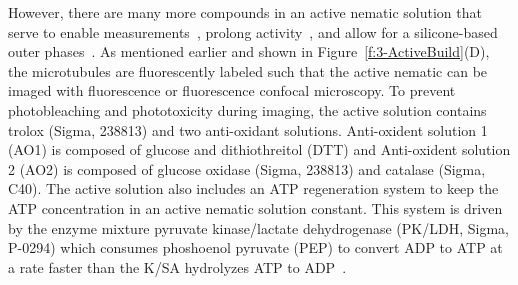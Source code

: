 However, there are many more compounds in an active nematic solution that serve to enable measurements~\cite{RN3,RN135}, prolong activity~\cite{RN3,RN135}, and allow for a silicone-based outer phases~\cite{RN135}.
As mentioned earlier and shown in Figure~\ref{f:3-ActiveBuild}(D), the microtubules are fluorescently labeled such that the active nematic can be imaged with fluorescence or fluorescence confocal microscopy.
To prevent photobleaching and phototoxicity during imaging, the active solution contains trolox (Sigma, 238813) and two anti-oxidant solutions.
Anti-oxident solution 1 (AO1) is composed of glucose and dithiothreitol (DTT) and Anti-oxident solution 2 (AO2) is composed of glucose oxidase (Sigma, 238813) and catalase (Sigma, C40).
The active solution also includes an ATP regeneration system to keep the ATP concentration in an active nematic solution constant.
This system is driven by the enzyme mixture pyruvate kinase/lactate dehydrogenase (PK/LDH, Sigma, P-0294) which consumes phoshoenol pyruvate (PEP) to convert ADP to ATP at a rate faster than the K/SA hydrolyzes ATP to ADP~\cite{RN246}.


